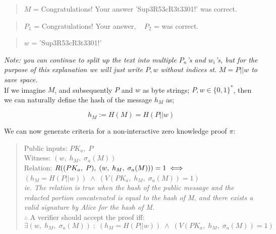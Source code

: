 \documentclass[]{article}
\begin{document}
\begin{quote}
$M$ = Congratulations! Your answer 'Sup3R53cR3t3301!' was correct.
\end{quote}

\begin{quote}
	$P_1$ = Congratulations! Your answer,    $\;\;\;P_2$ = was correct. 
\end{quote}

\begin{quote}
	$w$ = 'Sup3R53cR3t3301!'
\end{quote}

\noindent \textit{Note: you can continue to split up the text into multiple $P_n$'s and $w_i$'s, but for the purpose of this explanation we will just write $P,w$ without indices st. $M=P||w$ to save space.}\\

If we imagine $M$, and subsequently $P$ and $w$ as byte strings; $P,w \in \{0,1\}^*$, then we can naturally define the hash of the message $h_M$ as;

$$
h_M := H(M) = H(P||w)
$$

\noindent We can now generate criteria for a non-interactive zero knowledge proof $\pi$:

\begin{quote}

	Public inputs: $PK_a,\; P$\\
	Witness: $(w, \; h_M, \; \sigma_a(M))$\\
	
	Relation: $R( (PK_a,\; P), \; (w, \; h_M, \; \sigma_a(M))) = 1 \iff\\$
	\hspace*{1.55cm}$(h_M=H(P||w)) \; \land \; (V(PK_a, \; h_M,\;  \sigma_a(M))=1)$\\
	
	\textit{ie. The relation is true when the hash of the public message and the redacted portion concatenated is equal to the hash of M, and there exists a valid signature by Alice for the hash of M.}\\
	
	$\therefore$ A verifier should accept the proof iff:
	$$\exists (w, \; h_M, \; \sigma_a(M)) \;:\; (h_M=H(P||w)) \; \land \; (V(PK_a, \; h_M,\;  \sigma_a(M))=1)$$

\end{quote}
\end{document}
